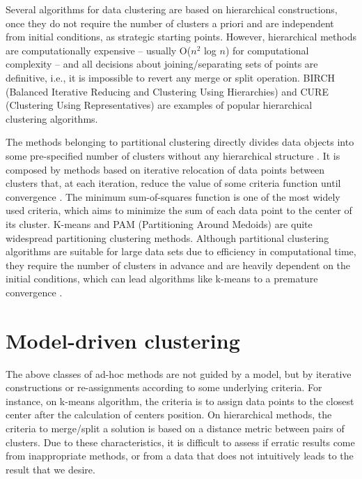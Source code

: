 Several algorithms for data clustering are based on hierarchical constructions, once they do not require the number of clusters a priori and are independent from initial conditions, as strategic starting points. However, hierarchical methods are computationally expensive -- usually O($n^2$ log $n$) for computational complexity -- and all decisions about joining/separating sets of points are definitive, i.e., it is impossible to revert any merge or split operation. BIRCH (Balanced Iterative Reducing and Clustering Using Hierarchies) \cite{Zhang96} and CURE (Clustering Using Representatives) \cite{Guha1998} are examples of popular hierarchical clustering algorithms.
 
The methods belonging to partitional clustering directly divides data objects into some pre-specified number of clusters without any hierarchical structure \cite{Xu2005}. It is composed by methods based on iterative relocation of data points between clusters that, at each iteration, reduce the value of some criteria function until convergence \cite{Karkkainen2006}. The minimum sum-of-squares function is one of the most widely used criteria, which aims to minimize the sum of each data point to the center of its cluster. K-means and PAM (Partitioning Around Medoids) are quite widespread partitioning clustering methods. Although partitional clustering algorithms are suitable for large data sets due to efficiency in computational time, they require the number of clusters in advance and are heavily dependent on the initial conditions, which can lead algorithms like k-means to a premature convergence \cite{Das2009}.

\section{Model-driven clustering}
The above classes of ad-hoc methods are not guided by a model, but by iterative constructions or re-assignments according to some underlying criteria. For instance, on k-means algorithm, the criteria is to assign data points to the closest center after the calculation of centers position. On hierarchical methods, the criteria to merge/split a solution is based on a distance metric between pairs of clusters. Due to these characteristics, it is difficult to assess if erratic results come from inappropriate methods, or from a data that does not intuitively leads to the result that we desire.

